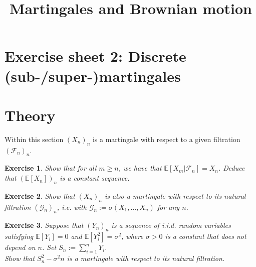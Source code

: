\documentclass[12pt]{amsart}
\title{Martingales and Brownian motion}
\newtheorem{exo}{Exercise}
\numberwithin{equation}{section}
\newcommand{\E}{\mathbb E}
\renewcommand{\1}{\mathbf 1}
\begin{document}
\maketitle


\section*{Exercise sheet 2: Discrete (sub-/super-)martingales}
\section{Theory}

Within this section $(X_n)_n$ is a martingale with respect to a given filtration $(\mathcal{F}_n)_n$.

\begin{exo}
   Show that for all $m \geq n$, we have that $\E[X_m | \mathcal{F}_n] = X_n$. Deduce that $(\E[X_n])_n$ is a constant sequence.
\end{exo}


\begin{exo}
    Show that $(X_n)_n$ is also a martingale with respect to its natural filtration $(\mathcal{G}_n)_n$, \textit{i.e.} with $\mathcal{G}_n := \sigma(X_1,\dots,X_n)$ for any $n$.
\end{exo}


\begin{exo}
    Suppose that $(Y_n)_n$ is a sequence of \textit{i.i.d.} random variables satisfying $\E[Y_i]=0$ and $\E[Y_i^2]=\sigma^2$, where $\sigma>0$ is a constant that does not depend on $n$. Set $S_n:=\sum_{i=1}^n Y_i$.\\
    Show that $S_n^2-\sigma^2 n$ is a martingale with respect to its natural filtration.
\end{exo}
\end{document}

